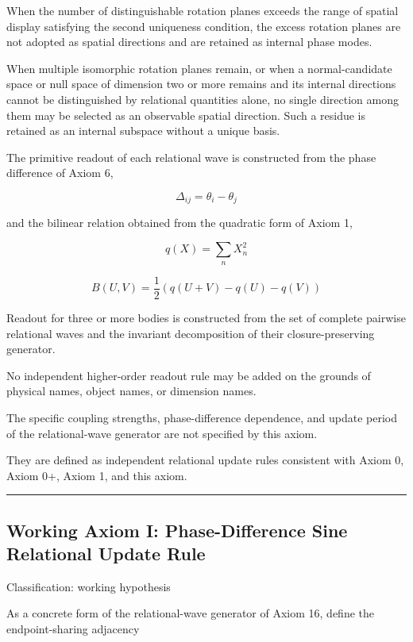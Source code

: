 \documentclass[
  a4paper,
]{article}
\begin{document}
When the number of distinguishable rotation planes exceeds the range of
spatial display satisfying the second uniqueness condition, the excess
rotation planes are not adopted as spatial directions and are retained
as internal phase modes.

When multiple isomorphic rotation planes remain, or when a
normal-candidate space or null space of dimension two or more remains
and its internal directions cannot be distinguished by relational
quantities alone, no single direction among them may be selected as an
observable spatial direction. Such a residue is retained as an internal
subspace without a unique basis.

The primitive readout of each relational wave is constructed from the
phase difference of Axiom 6,

\[
\Delta_{ij}=\theta_i-\theta_j
\]

and the bilinear relation obtained from the quadratic form of Axiom 1,

\[
q(X)=\sum_n X_n^2
\]

\[
B(U,V)
=\frac{1}{2}\left(q(U+V)-q(U)-q(V)\right)
\]

Readout for three or more bodies is constructed from the set of complete
pairwise relational waves and the invariant decomposition of their
closure-preserving generator.

No independent higher-order readout rule may be added on the grounds of
physical names, object names, or dimension names.

The specific coupling strengths, phase-difference dependence, and update
period of the relational-wave generator are not specified by this axiom.

They are defined as independent relational update rules consistent with
Axiom 0, Axiom 0+, Axiom 1, and this axiom.

\begin{center}\rule{0.5\linewidth}{0.5pt}\end{center}

\subsection{Working Axiom I: Phase-Difference Sine Relational Update
Rule}\label{working-axiom-i-phase-difference-sine-relational-update-rule}

Classification: working hypothesis

As a concrete form of the relational-wave generator of Axiom 16, define
the endpoint-sharing adjacency
\end{document}
